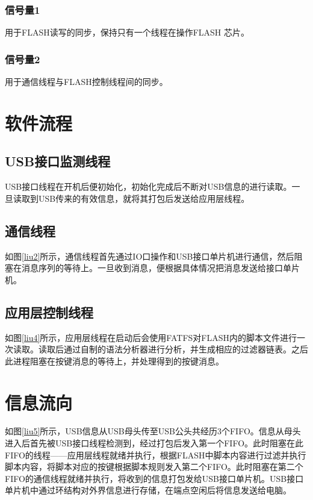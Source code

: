 \subsubsection{信号量1}
用于FLASH读写的同步，保持只有一个线程在操作FLASH 芯片。
\subsubsection{信号量2}
用于通信线程与FLASH控制线程间的同步。



\section{软件流程}
\subsection{USB接口监测线程}
USB接口线程在开机后便初始化，初始化完成后不断对USB信息的进行读取。一旦读取到USB传来的有效信息，就将其打包后发送给应用层线程。

\subsection{通信线程}
如图\ref{liu2}所示，通信线程首先通过IO口操作和USB接口单片机进行通信，然后阻塞在消息序列的等待上。一旦收到消息，便根据具体情况把消息发送给接口单片机。

\subsection{应用层控制线程}
如图\ref{liu4}所示，应用层线程在启动后会使用FATFS对FLASH内的脚本文件进行一次读取。读取后通过自制的语法分析器进行分析，并生成相应的过滤器链表。之后此进程阻塞在按键消息的等待上，并处理得到的按键消息。

\section{信息流向}
如图\ref{liu5}所示，USB信息从USB母头传至USB公头共经历3个FIFO。信息从母头进入后首先被USB接口线程检测到，经过打包后发入第一个FIFO。此时阻塞在此FIFO的线程——应用层线程就绪并执行，根据FLASH中脚本内容进行过滤并执行脚本内容，将脚本对应的按键根据脚本规则发入第二个FIFO。此时阻塞在第二个FIFO的通信线程就绪并执行，将收到的信息打包发给USB接口单片机。USB接口单片机中通过环结构对外界信息进行存储，在端点空闲后将信息发送给电脑。

